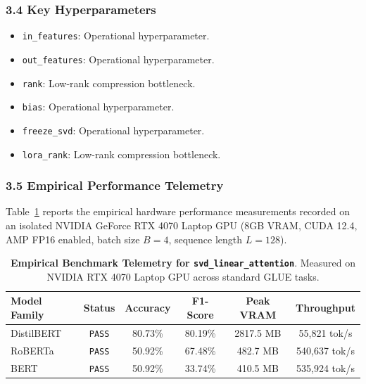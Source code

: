 \subsubsection*{3.4 Key Hyperparameters}
\begin{itemize}
    \item \texttt{in\_features}: Operational hyperparameter.
    \item \texttt{out\_features}: Operational hyperparameter.
    \item \texttt{rank}: Low-rank compression bottleneck.
    \item \texttt{bias}: Operational hyperparameter.
    \item \texttt{freeze\_svd}: Operational hyperparameter.
    \item \texttt{lora\_rank}: Low-rank compression bottleneck.
\end{itemize}

\subsubsection*{3.5 Empirical Performance Telemetry}
Table~\ref{tab:telemetry_svd_linear_attention} reports the empirical hardware performance measurements recorded on an isolated NVIDIA GeForce RTX 4070 Laptop GPU (8GB VRAM, CUDA 12.4, AMP FP16 enabled, batch size $B=4$, sequence length $L=128$).

\begin{table}[h]
\centering
\small
\caption{\textbf{Empirical Benchmark Telemetry for \texttt{svd\_linear\_attention}}. Measured on NVIDIA RTX 4070 Laptop GPU across standard GLUE tasks.}
\label{tab:telemetry_svd_linear_attention}
\begin{tabular*}{\columnwidth}{@{\extracolsep{\fill}}lccccc}
\toprule
\textbf{Model Family} & \textbf{Status} & \textbf{Accuracy} & \textbf{F1-Score} & \textbf{Peak VRAM} & \textbf{Throughput} \\
\midrule
DistilBERT & \texttt{PASS} & 80.73\% & 80.19\% & 2817.5 MB & 55,821 tok/s \\
RoBERTa & \texttt{PASS} & 50.92\% & 67.48\% & 482.7 MB & 540,637 tok/s \\
BERT & \texttt{PASS} & 50.92\% & 33.74\% & 410.5 MB & 535,924 tok/s \\
\bottomrule
\end{tabular*}
\end{table}

